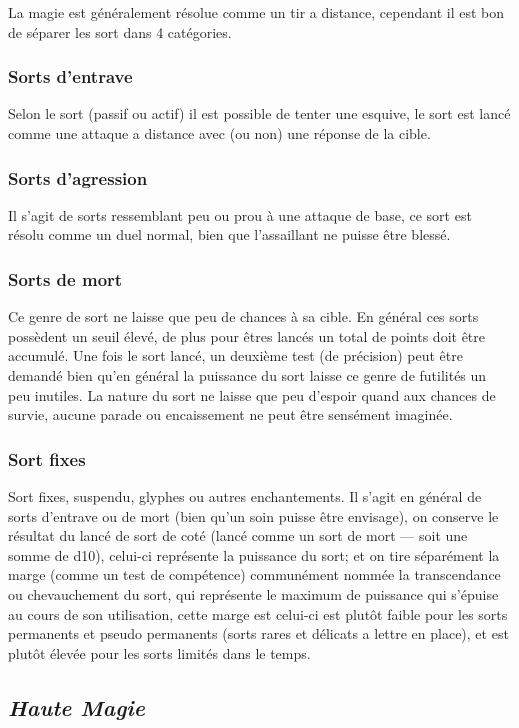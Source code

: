 La magie est généralement résolue comme un tir a distance, cependant il est bon de séparer les sort dans 4 catégories.

\subsubsection{Sorts d’entrave}
Selon le sort (passif ou actif) il est possible de tenter une esquive, le sort est lancé comme une attaque a distance avec (ou non) une réponse de la cible.

\subsubsection{Sorts d’agression}
Il s’agit de sorts ressemblant peu ou prou à une attaque de base, ce sort est résolu comme un duel normal, bien que l’assaillant ne puisse être blessé.

\subsubsection{Sorts de mort}
Ce genre de sort ne laisse que peu de chances à sa cible.
En général ces sorts possèdent un seuil élevé, de plus pour êtres lancés un total de points doit être accumulé. Une fois le sort lancé, 
un deuxième test (de précision) peut être demandé bien qu’en général la puissance du sort laisse ce genre de futilités un peu inutiles.
La nature du sort ne laisse que peu d’espoir quand aux chances de survie, aucune parade ou encaissement ne peut être sensément imaginée.

\subsubsection{Sort fixes}
Sort fixes, suspendu, glyphes ou autres enchantements.
Il s’agit en général de sorts d’entrave ou de mort (bien qu’un soin puisse être envisage), 
on conserve le résultat du lancé de sort de coté (lancé comme un sort de mort — soit une somme de d10), celui-ci représente la puissance du sort; et on tire séparément la marge (comme un test de compétence) communément nommée la transcendance ou chevauchement du sort, qui représente le maximum de puissance qui s'épuise au cours de son utilisation, cette marge est celui-ci est plutôt faible pour les sorts permanents et pseudo permanents (sorts rares et délicats a lettre en place), et est plutôt élevée pour les sorts limités dans le temps.

\subsection{\em Haute Magie}
